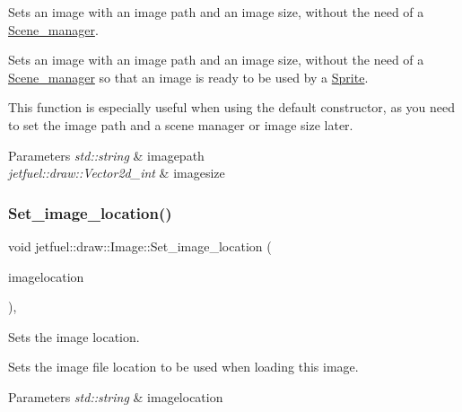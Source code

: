 Sets an image with an image path and an image size, without the need of a \hyperlink{classjetfuel_1_1draw_1_1Scene__manager}{Scene\+\_\+manager}. 

Sets an image with an image path and an image size, without the need of a \hyperlink{classjetfuel_1_1draw_1_1Scene__manager}{Scene\+\_\+manager} so that an image is ready to be used by a \hyperlink{classjetfuel_1_1draw_1_1Sprite}{Sprite}.

This function is especially useful when using the default constructor, as you need to set the image path and a scene manager or image size later.


\begin{DoxyParams}{Parameters}
{\em std\+::string} & imagepath \\
\hline
{\em jetfuel\+::draw\+::\+Vector2d\+\_\+int} & imagesize \\
\hline
\end{DoxyParams}
\mbox{\label{classjetfuel_1_1draw_1_1Image_a0426e7dcc92eb1220cc8d1a508bdcca8}} 
\subsubsection{\texorpdfstring{Set\+\_\+image\+\_\+location()}{Set\_image\_location()}}
{\footnotesize\ttfamily void jetfuel\+::draw\+::\+Image\+::\+Set\+\_\+image\+\_\+location (\begin{DoxyParamCaption}\item[{const std\+::string}]{imagelocation }\end{DoxyParamCaption})\hspace{0.3cm}{\ttfamily [inline]}, {\ttfamily [protected]}}



Sets the image location. 

Sets the image file location to be used when loading this image.


\begin{DoxyParams}{Parameters}
{\em std\+::string} & imagelocation \\
\hline
\end{DoxyParams}
\mbox{\label{classjetfuel_1_1draw_1_1Image_a9252d59e532f26b94572f155c4d4b118}} 
